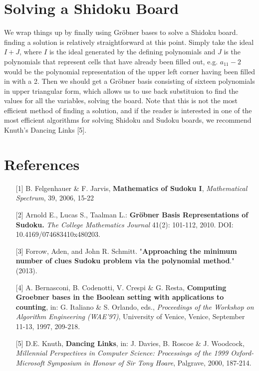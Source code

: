 \documentclass[12pt]{amsart}
\begin{document}
\section{Solving a Shidoku Board}
We wrap things up by finally using Gr\" obner bases to solve a Shidoku board. finding a solution is relatively straightforward at this point. Simply take the ideal $I + J$, where $I$ is the ideal generated by the defining polynomials and $J$ is the polynomials that represent cells that have already been filled out, e.g. $a_{11} - 2$ would be the polynomial representation of the upper left corner having been filled in with a 2. Then we should get a Gr\" obner basis consisting of sixteen polynomials in upper triangular form, which allows us to use back substituion to find the values for all the variables, solving the board. Note that this is not the most efficient method of finding a solution, and if the reader is interested in one of the most efficient algorithms for solving Shidoku and Sudoku boards, we recommend Knuth's Dancing Links [5].\\

\section{References}
\begin{itemize}
\item [{[1]}]  B. Felgenhauer \& F. Jarvis, \textbf{Mathematics of Sudoku I}, \textit{Mathematical Spectrum}, 39, 2006, 15-22
\item [{[2]}] Arnold E., Lucas S., Taalman L.: \textbf{Gr\" obner Basis Representations of Sudoku.} \textit{The College Mathematics Journal} 41(2): 101-112, 2010. DOI:
10.4169/074683410x480203. 
\item [{[3]}] Forrow, Aden, and John R. Schmitt. "\textbf{Approaching the minimum number of clues Sudoku problem via the polynomial method}." (2013).
\item [{[4]}] A. Bernasconi, B. Codenotti, V. Crespi \& G. Resta, \textbf{Computing Groebner bases in the Boolean setting with applications to counting}, in: G. Italiano \& S. Orlando, eds., \textit{Proceedings of the Workshop on Algorithm Engineering (WAE'97)}, University of Venice, Venice, September 11-13, 1997, 209-218.
\item [{[5]}] D.E. Knuth, \textbf{Dancing Links}, in: J. Davies, B. Roscoe \& J. Woodcock, \textit{Millennial Perspectives in Computer Science: Processings of the 1999 Oxford-Microsoft Symposium in Honour of Sir Tony Hoare}, Palgrave, 2000, 187-214.
\end{itemize}
\end{document}
